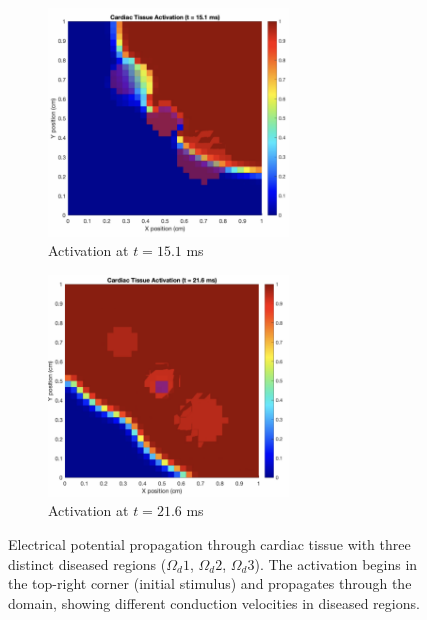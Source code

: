 \documentclass[12pt,a4paper]{article}
\begin{document}
\begin{figure}[H]
    \centering
    \begin{subfigure}[b]{0.48\textwidth}
        \includegraphics[width=0.7\textwidth]{../Assets/activation_t15.png}
        \caption{Activation at $t=15.1$ ms}
        \label{fig:activation_t15}
    \end{subfigure}
    \hfill
    \begin{subfigure}[b]{0.48\textwidth}
        \includegraphics[width=0.7\textwidth]{../Assets/activation_t21.png}
        \caption{Activation at $t=21.6$ ms}
        \label{fig:activation_t21}
    \end{subfigure}
    \caption{Electrical potential propagation through cardiac tissue with three distinct diseased regions ($\Omega_d1$, $\Omega_d2$, $\Omega_d3$). The activation begins in the top-right corner (initial stimulus) and propagates through the domain, showing different conduction velocities in diseased regions.}
    \label{fig:activation}
\end{figure}
\end{document}
